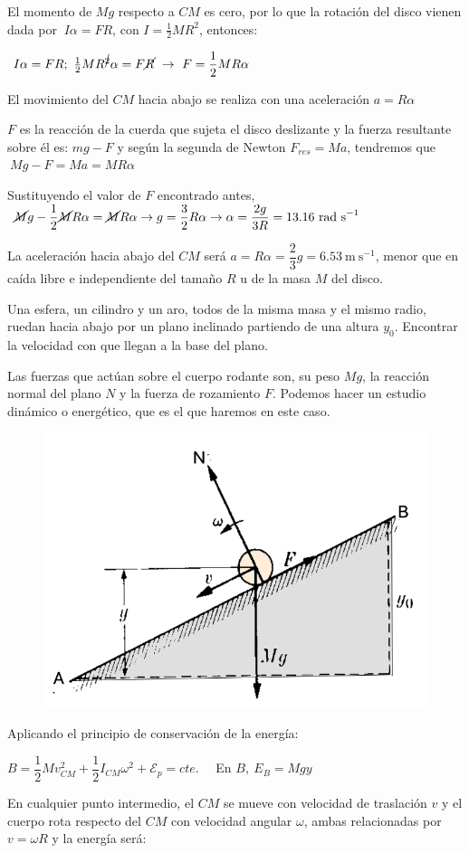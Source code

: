 El momento de $Mg$ respecto a $CM$ es cero, por lo que la rotación del disco vienen dada por $\ I\alpha=FR$, con $I=\frac 1 2 MR^2$, entonces:

$\ I\alpha=FR; \ \frac 1 2 M R^{\cancel{2}} \alpha=F\cancel{R} \ \to \ F=\dfrac 1 2 M R \alpha$

El movimiento del $CM$ hacia abajo se realiza con una aceleración $a=R\alpha$

$F$ es la reacción de la cuerda que sujeta el disco deslizante y la fuerza resultante sobre él es: $mg-F$ y según la segunda de Newton $F_{res}=Ma$, tendremos que $\ Mg-F=Ma=MR\alpha$

Sustituyendo el valor de $F$ encontrado antes, $ \ \cancel{M}g-\dfrac 1 2 \cancel{M}R\alpha=\cancel{M}R\alpha \to g=\dfrac 3 2 R\alpha \to \alpha =\dfrac{2g}{3R}=13.16\ \mathrm{rad\ s}^{-1}$

La aceleración hacia abajo del $CM$ será $a=R\alpha=\dfrac 2 3 g= 6.53 \  \mathrm{m\ s}^{-1}$, menor que en caída libre e independiente del tamaño $R$ u de la masa $M$ del disco.

\begin{prob}
Una esfera, un cilindro y un aro, todos de la misma masa y el mismo radio, ruedan hacia abajo por un plano inclinado partiendo de una altura $y_0$. Encontrar la velocidad con que llegan a la base del plano.	
\end{prob}

\begin{multicols}{2}
Las fuerzas que actúan sobre el cuerpo rodante son, su peso $Mg$, la reacción normal del plano $N$ y la fuerza de rozamiento $F$. Podemos hacer un estudio dinámico o energético, que es el que haremos en este caso.
\begin{figure}[H]
	\centering
	\includegraphics[width=.35\textwidth]{imagenes/imagenes16/T16IM14.png}
\end{figure}	
\end{multicols}
Aplicando el principio de conservación de la energía:

$B=\dfrac 1 2 Mv^2_{CM} + \dfrac 1 2 I_{CM} \omega^2 + \mathcal E_p = cte.\quad$ En $B,\  E_B=Mgy$

En cualquier punto intermedio, el $CM$ se mueve con velocidad de traslación $v$ y el cuerpo rota respecto del $CM$ con velocidad angular $\omega$, ambas relacionadas por $v=\omega R$ y la energía será:

